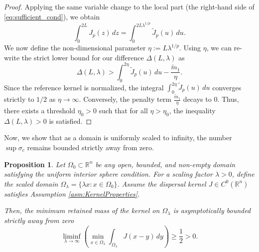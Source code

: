 \documentclass[12pt, a4paper]{article}
\theoremstyle{break}
\theoremstyle{break}
\newtheorem{prp}{Proposition}[section]
\theoremstyle{break}
\theoremstyle{break}
\theoremstyle{break}
\theoremstyle{break}
\theoremstyle{break}
\theoremstyle{break}
\theoremstyle{break}
\begin{document}
\begin{proof}
    Applying the same variable change to the local part (the right-hand side of \eqref{eq:sufficient_cond}), we obtain
    \begin{equation*}
        \int_0^{2L} J_p(z) \, dz = \int_0^{2 L \lambda^{1/p}} \tilde{J}_p(u) \, du.
    \end{equation*}
    We now define the non-dimensional parameter $\eta := L \lambda^{1/p}$. Using $\eta$, we can re-write the strict lower bound for our difference $\Delta(L, \lambda)$ as
    \begin{equation*}
        \Delta(L, \lambda) > \int_0^{2\eta} \tilde{J}_p(u) \, du - \frac{ \tilde{m}_1}{\eta}.
    \end{equation*}
    Since the reference kernel is normalized, the integral $\int_0^{2\eta} \tilde{J}_p(u) \, du$ converges strictly to $1/2$ as $\eta \to \infty$. Conversely, the penalty term $\frac{\tilde{m}_1}{\eta}$ decays to $0$. Thus, there exists a threshold $\eta_0 > 0$ such that for all $\eta > \eta_0$, the inequality $\Delta(L, \lambda) > 0$ is satisfied. 
\end{proof}

Now, we show that as a domain is uniformly scaled to infinity, the number $\sup \sigma_c$ remains bounded strictly away from zero.

\begin{prp}
    \label{prp:retained_mass_limit}
    Let $\Omega_0 \subset \mathbb{R}^n$ be any open, bounded, and non-empty domain satisfying the uniform interior sphere condition. For a scaling factor $\lambda > 0$, define the scaled domain $\Omega_\lambda = \{ \lambda x : x \in \Omega_0 \}$. Assume the dispersal kernel $J \in C^0(\mathbb{R}^n)$ satisfies Assumption \ref{asm:KernelProperties}.
    
    Then, the minimum retained mass of the kernel on $\Omega_\lambda$ is asymptotically bounded strictly away from zero
    \begin{equation}
        \liminf_{\lambda \to \infty} \left( \min_{x \in \overline{\Omega_\lambda}} \int_{\Omega_\lambda} J(x-y) \, dy \right) \geq \frac{1}{2} > 0.
    \end{equation}
\end{prp}
\end{document}
